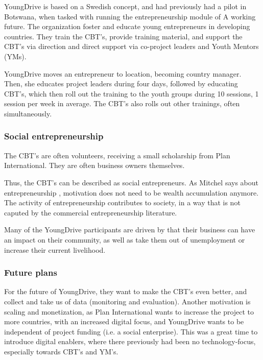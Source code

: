 YoungDrive is based on a Swedish concept, and had previously had a pilot in Botswana, when tasked with running the entrepreneurship module of A working future. The organization foster and educate young entrepreneurs in developing countries. They train the CBT's, provide training material, and support the CBT's via direction and direct support via co-project leaders and Youth Mentors (YMs).

YoungDrive moves an entrepreneur to location, becoming country manager. Then, she educates project leaders during four days, followed by educating CBT's, which then roll out the training to the youth groups during 10 sessions, 1 session per week in average. The CBT's also rolls out other trainings, often simultaneously.

\subsubsection{Social entrepreneurship}

The CBT's are often volunteers, receiving a small scholarship from Plan International. They are often business owners themselves.

Thus, the CBT's can be described as social entrepreneurs. As Mitchel says about entrepreneurship \cite{mitchel}, motivation does not need to be wealth accumulation anymore. The activity of entrepreneurship contributes to society, in a way that is not caputed by the commercial entrepreneurship literature.

Many of the YoungDrive participants are driven by that their business can have an impact on their community, as well as take them out of unemployment or increase their current livelihood.

\subsubsection{Future plans}

For the future of YoungDrive, they want to make the CBT's even better, and collect and take us of data (monitoring and evaluation). Another motivation is scaling and monetization, as Plan International wants to increase the project to more countries, with an increased digital focus, and YoungDrive wants to be independent of project funding (i.e. a social enterprise). This was a great time to introduce digital enablers, where there previously had been no technology-focus, especially towards CBT's and YM's.
